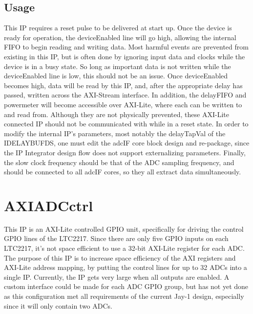 \documentclass[11pt]{article}
\begin{document}
\subsection{Usage}
This IP requires a reset pulse to be delivered at start up. Once the device is ready for operation, the deviceEnabled line will go high, allowing the 
internal FIFO to begin reading and writing data. Most harmful events are prevented from existing in this IP, but is often done by ignoring input data and
clocks while the device is in a busy state. So long as important data is not written while the deviceEnabled line is low, this should not be an issue. Once
deviceEnabled becomes high, data will be read by this IP, and, after the appropriate delay has passed, written across the AXI-Stream interface. In
addition, the delay\textunderscore FIFO and power\textunderscore meter will become accessible over AXI-Lite, where each can be written to and read from.
Although they are not physically prevented, these AXI-Lite connected IP should not be communicated with while in a reset state.
\hfill\break
In order to modify the internal IP's parameters, most notably the delayTapVal of the IDELAYBUFDS, one must edit the adc\textunderscore IF\textunderscore
core block design and re-package, since the IP Integrator design flow does not support externalizing parameters.
Finally, the slow clock frequency should be that of the ADC sampling frequency, and should be connected to all adc\textunderscore IF\textunderscore
cores, so they all extract data simultaneously.

\section{AXI\textunderscore ADC\textunderscore ctrl}
This IP is an AXI-Lite controlled GPIO unit, specifically for driving the control GPIO lines of the LTC2217. Since there are only five GPIO inputs on each
LTC2217, it's not space efficient to use a 32-bit AXI-Lite register for each ADC. The purpose of this IP is to increase space efficiency of the AXI
registers and AXI-Lite address mapping, by putting the control lines for up to 32 ADCs into a single IP.
Currently, the IP gets very large when all outputs are enabled. A custom interface could be made for each ADC GPIO group, but has not yet done as this
configuration met all requirements of the current Jay-1 design, especially since it will only contain two ADCs.
\end{document}
